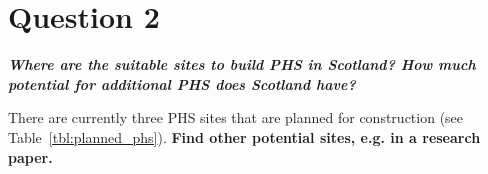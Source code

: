 \section{Question 2}

\textbf{\textit{Where are the suitable sites to build PHS in Scotland?
How much potential for additional PHS does Scotland have?}}

There are currently three PHS sites that are planned for construction (see Table~\ref{tbl:planned_phs}).
\textbf{Find other potential sites, e.g. in a research paper.}

